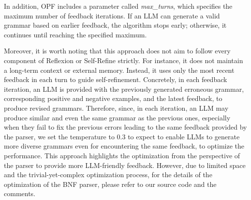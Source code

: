 In addition, OPF includes a parameter called \textit{max\_turns}, which specifies the maximum number of feedback iterations. If an LLM can generate a valid grammar based on earlier feedback, the algorithm stops early; otherwise, it continues until reaching the specified maximum.

Moreover, it is worth noting that this approach does not aim to follow every component of Reflexion or Self-Refine strictly. For instance, it does not maintain a long-term context or external memory. Instead, it uses only the most recent feedback in each turn to guide self-refinement. Concretely, in each feedback iteration, an LLM is provided with the previously generated erroneous grammar, corresponding positive and negative examples, and the latest feedback, to produce revised grammars. Therefore, since, in each iteration, an LLM may produce similar and even the same grammar as the previous ones, especially when they fail to fix the previous errors leading to the same feedback provided by the parser, we set the temperature to 0.3 to expect to enable LLMs to generate more diverse grammars even for encountering the same feedback, to optimize the performance. This approach highlights the optimization from the perspective of the parser to provide more LLM-friendly feedback. However, due to limited space and the trivial-yet-complex optimization process, for the details of the optimization of the BNF parser, please refer to our source code and the comments.



